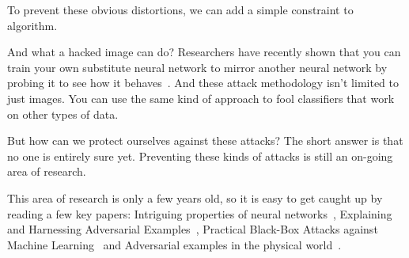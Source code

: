 \documentclass[10pt,twocolumn,letterpaper]{article}
\begin{document}
	\par
	To prevent these obvious distortions, we can add a simple constraint to algorithm.
	\par
	And what a hacked image can do? Researchers have recently shown that you can train your own substitute neural network to mirror another neural network by probing it to see how it behaves~\cite{Papernot}. And these attack methodology isn't limited to just images. You can use the same kind of approach to fool classifiers that work on other types of data.
	\par
	But how can we protect ourselves against these attacks? The short answer is that no one is entirely sure yet. Preventing these kinds of attacks is still an on-going area of research.
	\par
	This area of research is only a few years old, so it is easy to get caught up by reading a few key papers: Intriguing properties of neural networks~\cite{Christian}, Explaining and Harnessing Adversarial Examples~\cite{Goodfellow}, Practical Black-Box Attacks against Machine Learning~\cite{Papernot} and Adversarial examples in the physical world~\cite{Kurakin}.
	{\small
		
		
	}
\end{document}

